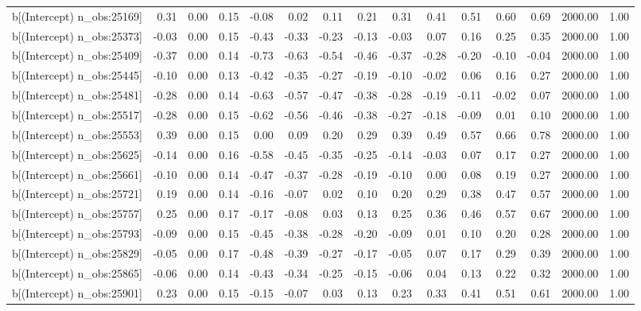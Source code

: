 \begin{table}[ht]
\begin{tabular}{rrrrrrrrrrrrrrr}
  b[(Intercept) n\_obs:25169] & 0.31 & 0.00 & 0.15 & -0.08 & 0.02 & 0.11 & 0.21 & 0.31 & 0.41 & 0.51 & 0.60 & 0.69 & 2000.00 & 1.00 \\ 
  b[(Intercept) n\_obs:25373] & -0.03 & 0.00 & 0.15 & -0.43 & -0.33 & -0.23 & -0.13 & -0.03 & 0.07 & 0.16 & 0.25 & 0.35 & 2000.00 & 1.00 \\ 
  b[(Intercept) n\_obs:25409] & -0.37 & 0.00 & 0.14 & -0.73 & -0.63 & -0.54 & -0.46 & -0.37 & -0.28 & -0.20 & -0.10 & -0.04 & 2000.00 & 1.00 \\ 
  b[(Intercept) n\_obs:25445] & -0.10 & 0.00 & 0.13 & -0.42 & -0.35 & -0.27 & -0.19 & -0.10 & -0.02 & 0.06 & 0.16 & 0.27 & 2000.00 & 1.00 \\ 
  b[(Intercept) n\_obs:25481] & -0.28 & 0.00 & 0.14 & -0.63 & -0.57 & -0.47 & -0.38 & -0.28 & -0.19 & -0.11 & -0.02 & 0.07 & 2000.00 & 1.00 \\ 
  b[(Intercept) n\_obs:25517] & -0.28 & 0.00 & 0.15 & -0.62 & -0.56 & -0.46 & -0.38 & -0.27 & -0.18 & -0.09 & 0.01 & 0.10 & 2000.00 & 1.00 \\ 
  b[(Intercept) n\_obs:25553] & 0.39 & 0.00 & 0.15 & 0.00 & 0.09 & 0.20 & 0.29 & 0.39 & 0.49 & 0.57 & 0.66 & 0.78 & 2000.00 & 1.00 \\ 
  b[(Intercept) n\_obs:25625] & -0.14 & 0.00 & 0.16 & -0.58 & -0.45 & -0.35 & -0.25 & -0.14 & -0.03 & 0.07 & 0.17 & 0.27 & 2000.00 & 1.00 \\ 
  b[(Intercept) n\_obs:25661] & -0.10 & 0.00 & 0.14 & -0.47 & -0.37 & -0.28 & -0.19 & -0.10 & 0.00 & 0.08 & 0.19 & 0.27 & 2000.00 & 1.00 \\ 
  b[(Intercept) n\_obs:25721] & 0.19 & 0.00 & 0.14 & -0.16 & -0.07 & 0.02 & 0.10 & 0.20 & 0.29 & 0.38 & 0.47 & 0.57 & 2000.00 & 1.00 \\ 
  b[(Intercept) n\_obs:25757] & 0.25 & 0.00 & 0.17 & -0.17 & -0.08 & 0.03 & 0.13 & 0.25 & 0.36 & 0.46 & 0.57 & 0.67 & 2000.00 & 1.00 \\ 
  b[(Intercept) n\_obs:25793] & -0.09 & 0.00 & 0.15 & -0.45 & -0.38 & -0.28 & -0.20 & -0.09 & 0.01 & 0.10 & 0.20 & 0.28 & 2000.00 & 1.00 \\ 
  b[(Intercept) n\_obs:25829] & -0.05 & 0.00 & 0.17 & -0.48 & -0.39 & -0.27 & -0.17 & -0.05 & 0.07 & 0.17 & 0.29 & 0.39 & 2000.00 & 1.00 \\ 
  b[(Intercept) n\_obs:25865] & -0.06 & 0.00 & 0.14 & -0.43 & -0.34 & -0.25 & -0.15 & -0.06 & 0.04 & 0.13 & 0.22 & 0.32 & 2000.00 & 1.00 \\ 
  b[(Intercept) n\_obs:25901] & 0.23 & 0.00 & 0.15 & -0.15 & -0.07 & 0.03 & 0.13 & 0.23 & 0.33 & 0.41 & 0.51 & 0.61 & 2000.00 & 1.00 \\ 

\end{tabular}
\end{table}
